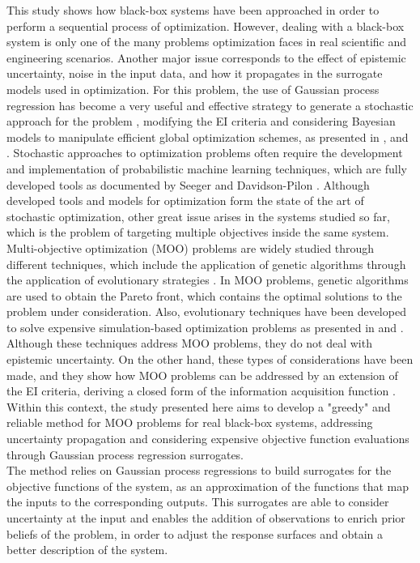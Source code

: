 \documentclass{article}
\begin{document}
This study shows how black-box systems have been approached in order to perform a sequential process of optimization. However, dealing with a black-box system is only one of the many problems optimization faces in real scientific and engineering scenarios. Another major issue corresponds to the effect of epistemic uncertainty, noise in the input data, and how it propagates in the surrogate models used in optimization. For this problem, the use of Gaussian process regression has become a very useful and effective strategy to generate a stochastic approach for the problem \cite{Wang2016}, modifying the EI criteria and considering Bayesian models to manipulate efficient global optimization schemes, as presented in \cite{Huang2006}, \cite{Pandita2016} and \cite{Li2014}. Stochastic approaches to optimization problems often require the development and implementation of probabilistic machine learning techniques, which are fully developed tools as documented by Seeger \cite{Seeger2004} and Davidson-Pilon \cite{Davidson-Pilon2014}. Although developed tools and models for optimization form the state of the art of stochastic optimization, other great issue arises in the systems studied so far, which is the problem of targeting multiple objectives inside the same system.\\

Multi-objective optimization (MOO) problems are widely studied through different techniques, which include the application of genetic algorithms through the application of evolutionary strategies \cite{Costa2006}. In MOO problems, genetic algorithms are used to obtain the Pareto front, which contains the optimal solutions to the problem under consideration. Also, evolutionary techniques have been developed to solve expensive simulation-based optimization problems as presented in \cite{Guo2007} and \cite{Huang2009}. Although these techniques address MOO problems, they do not deal with epistemic uncertainty. On the other hand, these types of considerations have been made, and they show how MOO problems can be addressed by an extension of the EI criteria, deriving a closed form of the information acquisition function \cite{wagner2010expected}. Within this context, the study presented here aims to develop a "greedy" and reliable method for MOO problems for real black-box systems, addressing uncertainty propagation and considering expensive objective function evaluations through Gaussian process regression surrogates.\\

The method relies on Gaussian process regressions to build surrogates for the objective functions of the system, as an approximation of the functions that map the inputs to the corresponding outputs. This surrogates are able to consider uncertainty at the input and enables the addition of observations to enrich prior beliefs of the problem, in order to adjust the response surfaces and obtain a better description of the system.\\
\end{document}
